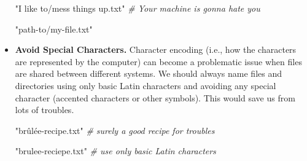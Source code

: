 \documentclass[
  11pt,
]{book}
\newenvironment{Shaded}{\begin{snugshade}}{\end{snugshade}}
\newcommand{\CommentTok}[1]{\textcolor[rgb]{0.56,0.35,0.01}{\textit{#1}}}
\newcommand{\StringTok}[1]{\textcolor[rgb]{0.31,0.60,0.02}{#1}}
\newenvironment{code-tex-bad}
  {\begingroup\definecolor{shadecolor}{RGB}{255, 189, 185}}
  {\endgroup}
\newenvironment{code-tex-good}
  {\begingroup\definecolor{shadecolor}{RGB}{224, 240, 227}}
  {\endgroup}
\begin{document}
\begin{itemize}
  \begin{code-tex-bad}

\begin{Shaded}
\begin{Highlighting}[]
\StringTok{"I like to/mess things up.txt"} \CommentTok{\# Your machine is gonna hate you }
\end{Highlighting}
\end{Shaded}

  \end{code-tex-bad}

  \begin{code-tex-good}

\begin{Shaded}
\begin{Highlighting}[]
\StringTok{"path{-}to/my{-}file.txt"}
\end{Highlighting}
\end{Shaded}

  \end{code-tex-good}
\item
  \textbf{Avoid Special Characters.} Character encoding (i.e., how the characters are represented by the computer) can become a problematic issue when files are shared between different systems. We should always name files and directories using only basic Latin characters and avoiding any special character (accented characters or other symbols). This would save us from lots of troubles.

  \begin{code-tex-bad}

\begin{Shaded}
\begin{Highlighting}[]
\StringTok{"brûlée{-}recipe.txt"} \CommentTok{\# surely a good recipe for troubles}
\end{Highlighting}
\end{Shaded}

  \end{code-tex-bad}

  \begin{code-tex-good}

\begin{Shaded}
\begin{Highlighting}[]
\StringTok{"brulee{-}reciepe.txt"} \CommentTok{\# use only basic Latin characters}
\end{Highlighting}
\end{Shaded}

  \end{code-tex-good}
\end{itemize}
\end{document}
